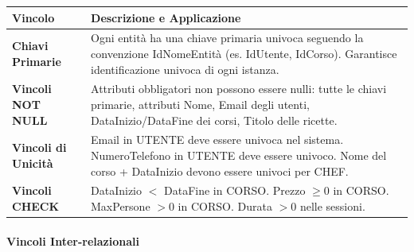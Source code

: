 \begin{center}
\begin{tcolorbox}[colback=white!98!gray, colframe=myblue!80!black, title=Vincoli Intra-relazionali, arc=4mm, boxrule=0.8pt, width=0.98\textwidth]
\renewcommand{\arraystretch}{1.2}
\begin{tabularx}{\textwidth}{p{4cm}X}
\textbf{Vincolo} & \textbf{Descrizione e Applicazione} \\
\hline
\textbf{Chiavi Primarie} & Ogni entità ha una chiave primaria univoca seguendo la convenzione IdNomeEntità (es. IdUtente, IdCorso). Garantisce identificazione univoca di ogni istanza. \\
\hline
\textbf{Vincoli NOT NULL} & Attributi obbligatori non possono essere nulli: tutte le chiavi primarie, attributi Nome, Email degli utenti, DataInizio/DataFine dei corsi, Titolo delle ricette. \\
\hline
\textbf{Vincoli di Unicità} & Email in UTENTE deve essere univoca nel sistema. NumeroTelefono in UTENTE deve essere univoco. Nome del corso + DataInizio devono essere univoci per CHEF. \\
\hline
\textbf{Vincoli CHECK} & DataInizio $<$ DataFine in CORSO. Prezzo $\geq 0$ in CORSO. MaxPersone $> 0$ in CORSO. Durata $> 0$ nelle sessioni. \\
\hline
\end{tabularx}
\end{tcolorbox}
\end{center}

\paragraph{Vincoli Inter-relazionali}


